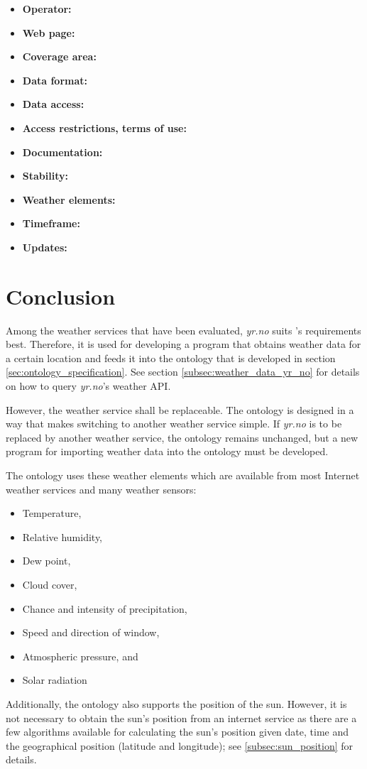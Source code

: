 \begin{itemize}
  \item \textbf{Operator:}
  \item \textbf{Web page:}
  \item \textbf{Coverage area:}
  \item \textbf{Data format:}
  \item \textbf{Data access:}
  \item \textbf{Access restrictions, terms of use:}
  \item \textbf{Documentation:}
  \item \textbf{Stability:}
  \item \textbf{Weather elements:}
  \item \textbf{Timeframe:}
  \item \textbf{Updates:}
\end{itemize}

\section{Conclusion}
\label{sec:weather_conclusion}

Among the weather services that have been evaluated, \emph{yr.no} suits \thinkhome's requirements best. Therefore, it is used for developing a program that obtains weather data for a certain location and feeds it into the \thinkhomeweather ontology that is developed in section \ref{sec:ontology_specification}. See section \ref{subsec:weather_data_yr_no} for details on how to query \emph{yr.no}'s weather API.

However, the weather service shall be replaceable. The ontology is designed in a way that makes switching to another weather service simple. If \emph{yr.no} is to be replaced by another weather service, the ontology remains unchanged, but a new program for importing weather data into the ontology must be developed.

The ontology uses these weather elements which are available from most Internet weather services and many weather sensors:
\begin{itemize}
  \item Temperature,
  \item Relative humidity,
  \item Dew point,
  \item Cloud cover,
  \item Chance and intensity of precipitation,
  \item Speed and direction of window,
  \item Atmospheric pressure, and
  \item Solar radiation
\end{itemize}

Additionally, the ontology also supports the position of the sun. However, it is not necessary to obtain the sun's position from an internet service as there are a few algorithms available for calculating the sun's position given date, time and the geographical position (latitude and longitude); see \ref{subsec:sun_position} for details.

